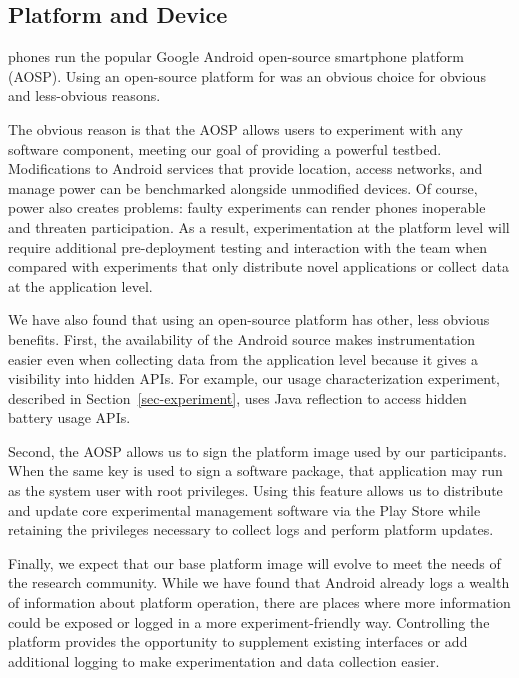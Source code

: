\subsection{Platform and Device}

\PhoneLab{} phones run the popular Google Android open-source smartphone
platform (AOSP). Using an open-source platform for \PhoneLab{} was an obvious
choice for obvious and less-obvious reasons.

The obvious reason is that the AOSP allows \PhoneLab{} users to experiment
with any software component, meeting our goal of providing a powerful
testbed. Modifications to Android services that provide location, access
networks, and manage power can be benchmarked alongside unmodified devices.
Of course, power also creates problems: faulty experiments can render phones
inoperable and threaten participation. As a result, experimentation at the
platform level will require additional pre-deployment testing and interaction
with the \PhoneLab{} team when compared with experiments that only distribute
novel applications or collect data at the application level.

We have also found that using an open-source platform has other, less obvious
benefits. First, the availability of the Android source makes \PhoneLab{}
instrumentation easier even when collecting data from the application level
because it gives a visibility into hidden APIs. For example, our usage
characterization experiment, described in Section~\ref{sec-experiment}, uses
Java reflection to access hidden battery usage APIs.

Second, the AOSP allows us to sign the platform image used by our
participants. When the same key is used to sign a software package, that
application may run as the system user with root privileges. Using this
feature allows us to distribute and update core \PhoneLab{} experimental
management software via the Play Store while retaining the privileges necessary
to collect logs and perform platform updates.

Finally, we expect that our base \PhoneLab{} platform image will evolve to
meet the needs of the research community. While we have found that Android
already logs a wealth of information about platform operation, there are
places where more information could be exposed or logged in a more
experiment-friendly way. Controlling the platform provides the opportunity to
supplement existing interfaces or add additional logging to make
experimentation and data collection easier.

